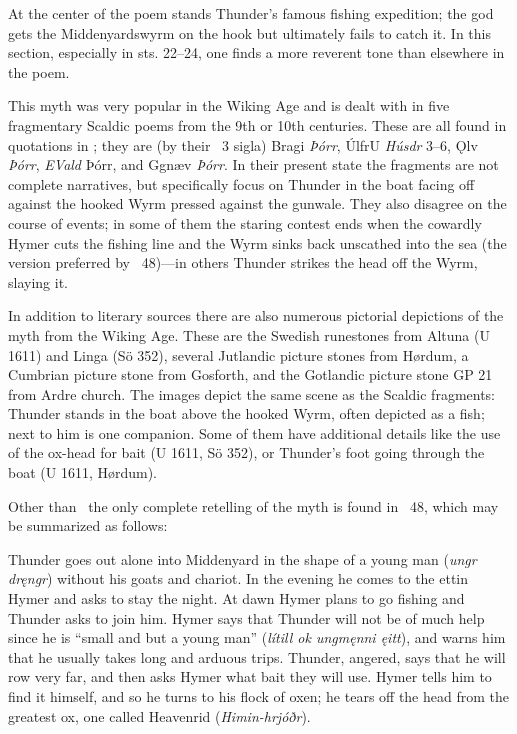 {\small At the center of the poem stands Thunder’s famous fishing expedition; the god gets the Middenyardswyrm on the hook but ultimately fails to catch it.  In this section, especially in sts. 22–24, one finds a more reverent tone than elsewhere in the poem.

This myth was very popular in the Wiking Age and is dealt with in five fragmentary Scaldic poems from the 9th or 10th centuries.  These are all found in quotations in \Skaldskaparmal; they are (by their \Skp\ 3 sigla) Bragi \emph{Þórr}, ÚlfrU \emph{Húsdr} 3–6, Ǫlv \emph{Þórr}, \emph{EVald} Þórr, and Ggnæv \emph{Þórr}.  In their present state the fragments are not complete narratives, but specifically focus on Thunder in the boat facing off against the hooked Wyrm pressed against the gunwale.  They also disagree on the course of events; in some of them the staring contest ends when the cowardly Hymer cuts the fishing line and the Wyrm sinks back unscathed into the sea (the version preferred by \Gylfaginning\ 48)—in others Thunder strikes the head off the Wyrm, slaying it.

In addition to literary sources there are also numerous pictorial depictions of the myth from the Wiking Age.  These are the Swedish runestones from Altuna (U 1611) and Linga (Sö 352), several Jutlandic picture stones from Hørdum, a Cumbrian picture stone from Gosforth, and the Gotlandic picture stone GP 21 from Ardre church.  The images depict the same scene as the Scaldic fragments: Thunder stands in the boat above the hooked Wyrm, often depicted as a fish; next to him is one companion.  Some of them have additional details like the use of the ox-head for bait (U 1611, Sö 352), or Thunder’s foot going through the boat (U 1611, Hørdum).

Other than \Hymiskvida\ the only complete retelling of the myth is found in \Gylfaginning\ 48, which may be summarized as follows:

Thunder goes out alone into Middenyard in the shape of a young man (\emph{ungr dręngr}) without his goats and chariot.  In the evening he comes to the ettin Hymer and asks to stay the night.  At dawn Hymer plans to go fishing and Thunder asks to join him.  Hymer says that Thunder will not be of much help since he is “small and but a young man” (\emph{lítill ok ungmęnni ęitt}), and warns him that he usually takes long and arduous trips.  Thunder, angered, says that he will row very far, and then asks Hymer what bait they will use.  Hymer tells him to find it himself, and so he turns to his flock of oxen; he tears off the head from the greatest ox, one called Heavenrid (\emph{Himin-hrjóðr}).

}
